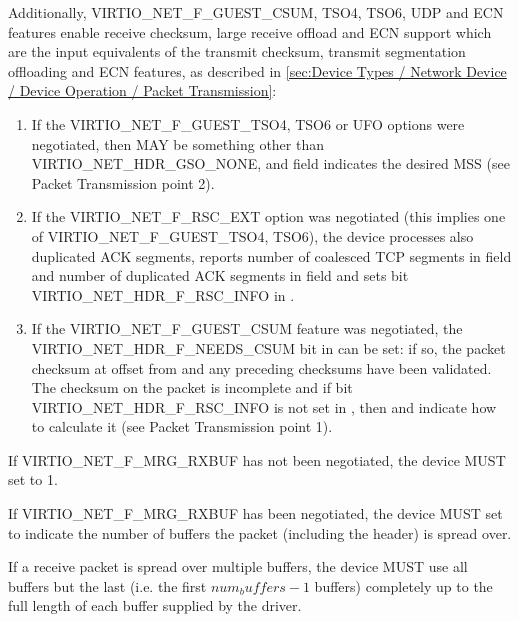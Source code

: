 Additionally, VIRTIO_NET_F_GUEST_CSUM, TSO4, TSO6, UDP and ECN
features enable receive checksum, large receive offload and ECN
support which are the input equivalents of the transmit checksum,
transmit segmentation offloading and ECN features, as described
in \ref{sec:Device Types / Network Device / Device Operation /
Packet Transmission}:
\begin{enumerate}
\item If the VIRTIO_NET_F_GUEST_TSO4, TSO6 or UFO options were
  negotiated, then  MAY be something other than
  VIRTIO_NET_HDR_GSO_NONE, and  field indicates the
  desired MSS (see Packet Transmission point 2).
\item If the VIRTIO_NET_F_RSC_EXT option was negotiated (this
  implies one of VIRTIO_NET_F_GUEST_TSO4, TSO6), the
  device processes also duplicated ACK segments, reports
  number of coalesced TCP segments in  field and
  number of duplicated ACK segments in  field
  and sets bit VIRTIO_NET_HDR_F_RSC_INFO in .
\item If the VIRTIO_NET_F_GUEST_CSUM feature was negotiated, the
  VIRTIO_NET_HDR_F_NEEDS_CSUM bit in  can be
  set: if so, the packet checksum at offset 
  from  and any preceding checksums
  have been validated.  The checksum on the packet is incomplete and
  if bit VIRTIO_NET_HDR_F_RSC_INFO is not set in ,
  then  and  indicate how to calculate it
  (see Packet Transmission point 1).

\end{enumerate}

\label{devicenormative:Device Types / Network Device / Device Operation / Processing of Packets}%

If VIRTIO_NET_F_MRG_RXBUF has not been negotiated, the device MUST set
 to 1.

If VIRTIO_NET_F_MRG_RXBUF has been negotiated, the device MUST set
 to indicate the number of buffers
the packet (including the header) is spread over.

If a receive packet is spread over multiple buffers, the device
MUST use all buffers but the last (i.e. the first $num_buffers -
1$ buffers) completely up to the full length of each buffer
supplied by the driver.

